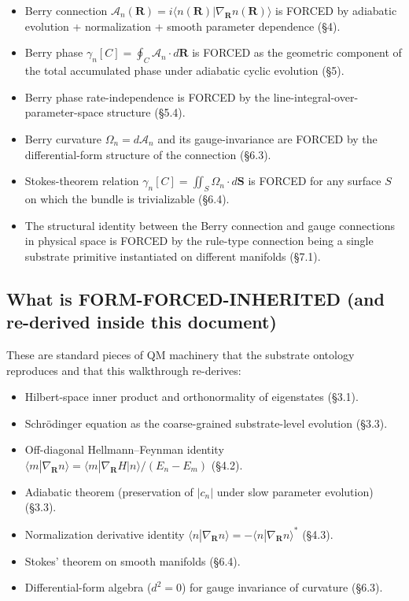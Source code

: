 \documentclass[11pt,a4paper]{article}
\begin{document}
\begin{itemize}[noitemsep]
  \item Berry connection $\mathcal{A}_n(\mathbf{R}) = i\langle n(\mathbf{R})|\nabla_\mathbf{R} n(\mathbf{R})\rangle$ is FORCED by adiabatic evolution + normalization + smooth parameter dependence (\S4).
  \item Berry phase $\gamma_n[C] = \oint_C \mathcal{A}_n\cdot d\mathbf{R}$ is FORCED as the geometric component of the total accumulated phase under adiabatic cyclic evolution (\S5).
  \item Berry phase rate-independence is FORCED by the line-integral-over-parameter-space structure (\S5.4).
  \item Berry curvature $\Omega_n = d\mathcal{A}_n$ and its gauge-invariance are FORCED by the differential-form structure of the connection (\S6.3).
  \item Stokes-theorem relation $\gamma_n[C] = \iint_S \Omega_n\cdot d\mathbf{S}$ is FORCED for any surface $S$ on which the bundle is trivializable (\S6.4).
  \item The structural identity between the Berry connection and gauge connections in physical space is FORCED by the rule-type connection being a single substrate primitive instantiated on different manifolds (\S7.1).
\end{itemize}

\subsection*{What is FORM-FORCED-INHERITED (and re-derived inside this document)}

These are standard pieces of QM machinery that the substrate ontology reproduces and that this walkthrough re-derives:

\begin{itemize}[noitemsep]
  \item Hilbert-space inner product and orthonormality of eigenstates (\S3.1).
  \item Schr\"odinger equation as the coarse-grained substrate-level evolution (\S3.3).
  \item Off-diagonal Hellmann--Feynman identity $\langle m|\nabla_\mathbf{R} n\rangle = \langle m|\nabla_\mathbf{R} H|n\rangle/(E_n-E_m)$ (\S4.2).
  \item Adiabatic theorem (preservation of $|c_n|$ under slow parameter evolution) (\S3.3).
  \item Normalization derivative identity $\langle n|\nabla_\mathbf{R} n\rangle = -\langle n|\nabla_\mathbf{R} n\rangle^*$ (\S4.3).
  \item Stokes' theorem on smooth manifolds (\S6.4).
  \item Differential-form algebra ($d^2 = 0$) for gauge invariance of curvature (\S6.3).
\end{itemize}
\end{document}
